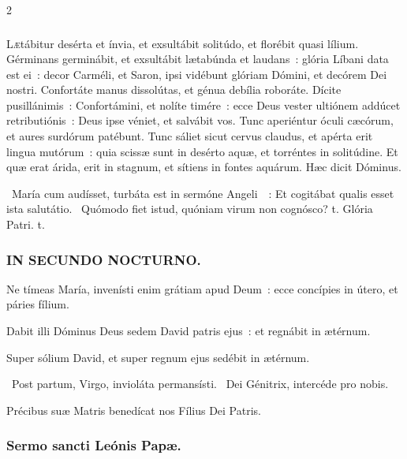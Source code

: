 \documentclass[9pt,twoside]{extarticle}
\begin{document}
\begin{multicols}{2}
{\subsubsection*{}
\lettrine{L}ætábitur desérta et ínvia, et exsultábit solitúdo, et florébit quasi lílium.
Gérminans germinábit, et exsultábit lætabúnda et laudans~: glória Líbani data est ei~: decor Carméli, et Saron, ipsi vidébunt glóriam Dómini, et decórem Dei nostri.
Confortáte manus dissolútas, et génua debília roboráte.
Dícite pusillánimis~: Confortámini, et nolíte timére~: ecce Deus vester ultiónem addúcet retributiónis~: Deus ipse véniet, et salvábit vos.
Tunc aperiéntur óculi cæcórum, et aures surdórum patébunt.
Tunc sáliet sicut cervus claudus, et apérta erit lingua mutórum~: quia scissæ sunt in desérto aquæ, et torréntes in solitúdine.
Et quæ erat árida, erit in stagnum, et sítiens in fontes aquárum. Hæc dicit Dóminus.

\begin{tightlist}{}
\item {}~María cum audísset, turbáta est in sermóne Angeli~~: \textred{*} Et cogitábat qualis esset ista salutátio. ~Quómodo fiet istud, quóniam virum non cognósco? t. Glória Patri. t.
\end{tightlist}

\subsubsection*{\center \textsc{IN SECUNDO NOCTURNO.}}
\begin{tightlist}{}
\item {} Ne tímeas María, invenísti enim grátiam apud Deum~: ecce concípies in útero, et páries fílium.
\item {} Dabit illi Dóminus Deus sedem David patris ejus~: et regnábit in ætérnum.
\item {} Super sólium David, et super regnum ejus sedébit in ætérnum.
\item {}~Post partum, Virgo, invioláta permansísti. ~Dei Génitrix, intercéde pro nobis.
\item {\small {} Précibus suæ Matris benedícat nos Fílius Dei Patris.}
\end{tightlist}

\subsubsection*{\center Sermo sancti Leónis Papæ.}
}
\end{multicols}
\end{document}
